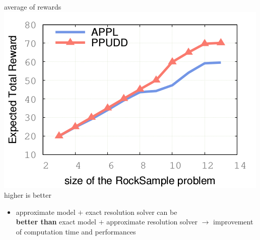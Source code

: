 \documentclass[12pt,svgnames,table]{beamer}
\begin{document}
\begin{frame}
{\begin{minipage}{0.43\linewidth}
	{\color{orange} average of rewards} \\
\vspace{-0.03cm}  
	\includegraphics[scale=0.4]{courbePerfTime.png} \\
\hspace{0.1cm} { \color{gggreen} higher is better}
	\end{minipage}

\vspace{-0.1cm}
\begin{alertblock}{}
\begin{itemize}
\item approximate model $+$ exact resolution solver can be \\
\textbf{better than} exact model $+$ approximate resolution solver
$\rightarrow$ improvement of computation time and performances
\end{itemize}
\end{alertblock}
}
\end{frame}



\newcommand{\grillethird}{
 \begin{tikzpicture}[overlay,remember picture]
   \begin{scope}[shift={(current page.south west)}]
	\tikzstyle{vertexBIGRED}=[fill=red!30,draw=red, minimum width=320pt, minimum height=30pt,line width=1pt,inner sep=5pt,rounded corners]
	\node[vertexBIGRED] at (6.5,7.4) {};
	\node at (6.5,7.4) {PPUDD outperforms its probabilistic counterpart};
   \end{scope}
 \end{tikzpicture}
 }
\end{document}
